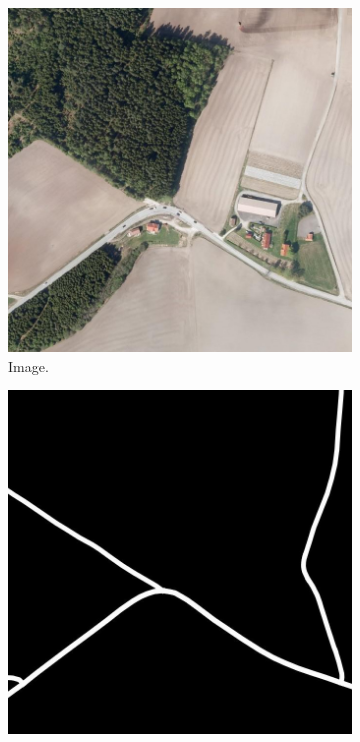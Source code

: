 \begin{figure}[H]
\begin{subfigure}{0.23\textwidth}
\includegraphics[width=\textwidth]{figs/appendix/img1151.jpg}
\caption{ Image. }
\vspace{0.2cm} %
\end{subfigure}
\hspace*{\fill} %
\begin{subfigure}{0.23\textwidth}
\includegraphics[width=\textwidth]{figs/appendix/label1151.jpg}

\end{subfigure}
\end{figure}
